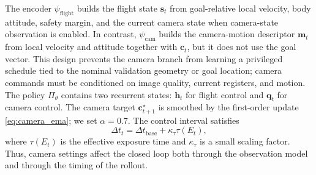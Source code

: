 \documentclass[letterpaper,journal]{IEEEtran}
\begin{document}
The encoder $\psi_{\mathrm{flight}}$ builds the flight state $\mathbf{s}_t$
from goal-relative local velocity, body attitude, safety margin, and the
current camera state when camera-state observation is enabled. In contrast,
$\psi_{\mathrm{cam}}$ builds the camera-motion descriptor $\mathbf{m}_t$ from
local velocity and attitude together with $\mathbf{c}_t$, but it does not use
the goal vector. This design prevents the camera branch from learning a
privileged schedule tied to the nominal validation geometry or goal location;
camera commands must be conditioned on image quality, current registers, and
motion. The policy
$\Pi_\theta$ contains two recurrent states: $\mathbf{h}_t$ for flight control
and $\mathbf{q}_t$ for camera control. The camera target
$\mathbf{c}_{t+1}^{\star}$ is smoothed by the first-order update
\eqref{eq:camera_ema}; we set $\alpha=0.7$. The control
interval satisfies
\begin{equation}
    \Delta t_t = \Delta t_{\mathrm{base}}+\kappa_\tau \tau(E_t),
    \label{eq:control_interval}
\end{equation}
where $\tau(E_t)$ is the effective exposure time and $\kappa_\tau$ is a small
scaling factor. Thus, camera settings affect the closed loop both through the
observation model and through the timing of the rollout.
\end{document}
